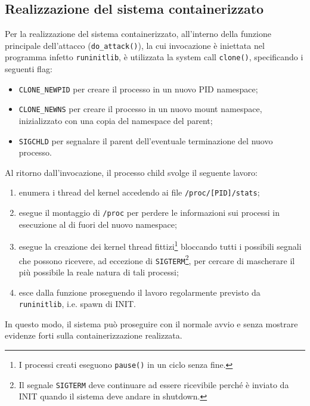\documentclass{article}
\begin{document}
\subsection{Realizzazione del sistema containerizzato}
Per la realizzazione del sistema containerizzato, all'interno della funzione principale dell'attacco (\texttt{do\_attack()}), la cui invocazione è iniettata nel programma infetto \texttt{runinitlib}, è utilizzata la system call \texttt{clone()}, specificando i seguenti flag:
\begin{itemize}
	\item \texttt{CLONE\_NEWPID} per creare il processo in un nuovo PID namespace;
	\item \texttt{CLONE\_NEWNS} per creare il processo in un nuovo mount namespace, inizializzato con una copia del namespace del parent;
	\item \texttt{SIGCHLD} per segnalare il parent dell'eventuale terminazione del nuovo processo.
\end{itemize}
Al ritorno dall'invocazione, il processo child svolge il seguente lavoro:
\begin{enumerate}
	\item enumera i thread del kernel accedendo ai file \texttt{/proc/[PID]/stats};
	\item esegue il montaggio di \texttt{/proc} per perdere le informazioni sui processi in esecuzione al di fuori del nuovo namespace;
	\item esegue la creazione dei kernel thread fittizi\footnote{I processi creati eseguono \texttt{pause()} in un ciclo senza fine.} bloccando tutti i possibili segnali che possono ricevere, ad eccezione di \texttt{SIGTERM}\footnote{Il segnale \texttt{SIGTERM} deve continuare ad essere ricevibile perché è inviato da INIT quando il sistema deve andare in shutdown.}, per cercare di mascherare il più possibile la reale natura di tali processi;
	\item esce dalla funzione proseguendo il lavoro regolarmente previsto da \texttt{runinitlib}, i.e. spawn di INIT.
\end{enumerate}
In questo modo, il sistema può proseguire con il normale avvio e senza mostrare evidenze forti sulla containerizzazione realizzata.
\end{document}
